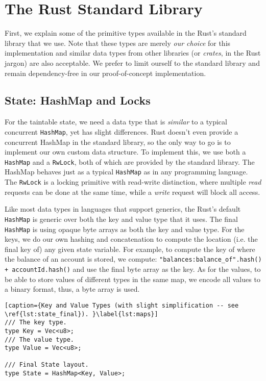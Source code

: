 \section{The Rust Standard Library}

First, we explain some of the primitive types available in the Rust's standard library that we
use. Note that these types are merely \textit{our choice} for this implementation and similar data
types from other libraries (or \textit{crates}, in the Rust jargon) are also acceptable. We prefer
to limit ourself to the standard library and remain dependency-free in our proof-of-concept
implementation.

\subsection{State: HashMap and Locks} \label{chap:impl:subsec:state_and_concurrent_map}

For the taintable state, we need a data type that is \textit{similar} to a typical concurrent
\texttt{HashMap}\cite{barnatFastDynamicallySizedConcurrent2015}, yet has slight differences. Rust
doesn't even provide a concurrent HashMap in the standard library, so the only way to go is to
implement our own custom data structure. To implement this, we use both a \texttt{HashMap} and a
\texttt{RwLock}, both of which are provided by the standard library. The HashMap behaves just as a
typical \texttt{HashMap} as in any programming language. The \texttt{RwLock} is a locking primitive
with read-write distinction, where multiple \textit{read} requests can be done at the same time,
while a \textit{write} request will block all access.

Like most data types in languages that support generics, the Rust's default \texttt{HashMap} is
generic over both the key and value type that it uses. The final \texttt{HashMap} is using opaque
byte arrays as both the key and value type. For the keys, we do our own hashing and concatenation to
compute the location (i.e. the final key of) any given state variable. For example, to compute the
key of where the balance of an account is stored, we compute: \texttt{"balances:balance\_of".hash()
+ accountId.hash()} and use the final byte array as the key. As for the values, to be able to store
values of different types in the same map, we encode all values to a binary format, thus, a byte
array is used.

\begin{lstlisting}[caption={Key and Value Types (with slight simplification -- see \ref{lst:state_final}). }\label{lst:maps}]
/// The key type.
type Key = Vec<u8>;
/// The value type.
type Value = Vec<u8>;

/// Final State layout.
type State = HashMap<Key, Value>;
\end{lstlisting}

